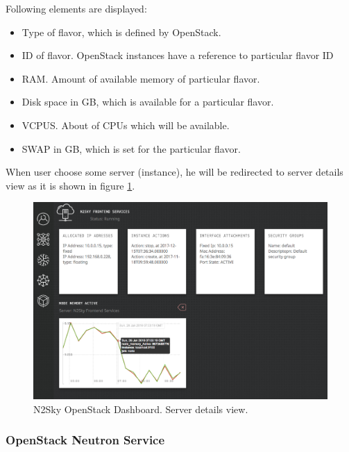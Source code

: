 \begin{description}
Following elements are displayed: 
\begin{itemize}
\item Type of flavor, which is defined by OpenStack.
\item ID of flavor. OpenStack instances have a reference to particular flavor ID
\item RAM. Amount of available memory of particular flavor. 
\item Disk space in GB, which is available for a particular flavor. 
\item VCPUS. About of CPUs which will be available. 
\item SWAP in GB, which is set for the particular flavor.
\end{itemize}

\end{description}

When user choose some server (instance), he will be redirected to server details view as it is shown in figure \ref{fig:openstack_server_details}.

 \begin{figure}[H]
\begin{center}
  \includegraphics[width=\linewidth]{components/4/pics/openstack_server_details.png}
  \caption{N2Sky OpenStack Dashboard. Server details view.}
  \label{fig:openstack_server_details}
\end{center}
\end{figure}

\subsubsection{OpenStack Neutron Service}\label{OpenStack Neutron Service}

